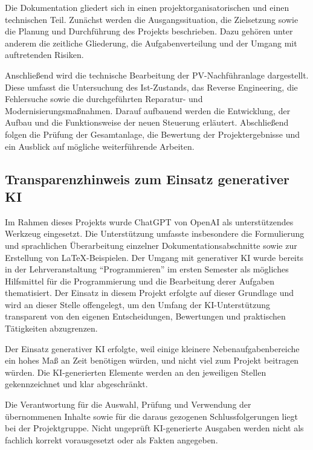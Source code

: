 Die Dokumentation gliedert sich in einen projektorganisatorischen und einen technischen Teil.
Zunächst werden die Ausgangssituation, die Zielsetzung sowie die Planung und Durchführung des Projekts beschrieben.
Dazu gehören unter anderem die zeitliche Gliederung, die Aufgabenverteilung und der Umgang mit auftretenden Risiken.

Anschließend wird die technische Bearbeitung der PV-Nachführanlage dargestellt.
Diese umfasst die Untersuchung des Ist-Zustands, das Reverse Engineering, die Fehlersuche sowie die durchgeführten Reparatur- und Modernisierungsmaßnahmen.
Darauf aufbauend werden die Entwicklung, der Aufbau und die Funktionsweise der neuen Steuerung erläutert.
Abschließend folgen die Prüfung der Gesamtanlage, die Bewertung der Projektergebnisse und ein Ausblick auf mögliche weiterführende Arbeiten.

\subsection*{Transparenzhinweis zum Einsatz generativer KI}

Im Rahmen dieses Projekts wurde ChatGPT von OpenAI als unterstützendes Werkzeug eingesetzt.
Die Unterstützung umfasste insbesondere die Formulierung und sprachlichen Überarbeitung einzelner Dokumentationsabschnitte sowie zur Erstellung von \LaTeX{}-Beispielen.
Der Umgang mit generativer KI wurde bereits in der Lehrveranstaltung \enquote{Programmieren} im ersten Semester als mögliches Hilfsmittel für die Programmierung und die Bearbeitung derer Aufgaben thematisiert.
Der Einsatz in diesem Projekt erfolgte auf dieser Grundlage und wird an dieser Stelle offengelegt, um den Umfang der KI-Unterstützung transparent von den eigenen Entscheidungen, Bewertungen und praktischen Tätigkeiten abzugrenzen.

Der Einsatz generativer KI erfolgte, weil einige kleinere Nebenaufgabenbereiche ein hohes Maß an Zeit benötigen würden, und nicht viel zum Projekt beitragen würden.
Die KI-generierten Elemente werden an den jeweiligen Stellen gekennzeichnet und klar abgeschränkt.

Die Verantwortung für die Auswahl, Prüfung und Verwendung der übernommenen Inhalte sowie für die daraus gezogenen Schlussfolgerungen liegt bei der Projektgruppe.
Nicht ungeprüft KI-generierte Ausgaben werden nicht als fachlich korrekt vorausgesetzt oder als Fakten angegeben.



